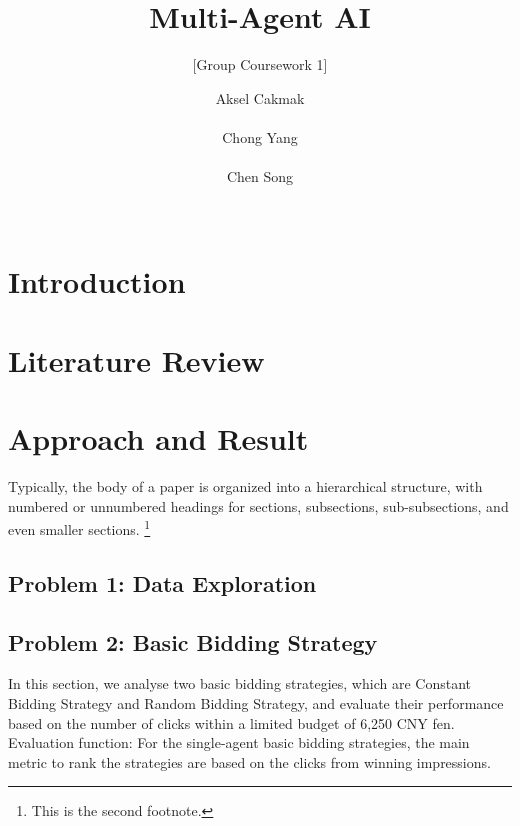 \documentclass{sig-alternate-05-2015}
\begin{document}

\title{Multi-Agent AI}
\subtitle{[Group Coursework 1]}

\author{
\alignauthor
Aksel Cakmak\\
       \\
\alignauthor
Chong Yang\\
       \\
\alignauthor
Chen Song \\
       \\
}

\maketitle

\section{Introduction}

\section{Literature Review}

\section{Approach and Result}
Typically, the body of a paper is organized
into a hierarchical structure, with numbered or unnumbered
headings for sections, subsections, sub-subsections, and even
smaller sections.
\footnote{This is the second footnote.}

\subsection{Problem 1: Data Exploration}

\subsection{Problem 2: Basic Bidding Strategy}
In this section, we analyse two basic bidding strategies, which are Constant Bidding Strategy and Random Bidding Strategy, and evaluate their performance based on the number of clicks within a limited budget of 6,250 CNY fen. 
Evaluation function: For the single-agent basic bidding strategies, the main metric to rank the strategies are based on the clicks from winning impressions.
\end{document}
